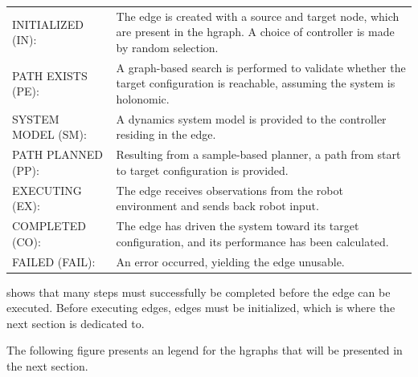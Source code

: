 \noindent
\begin{table}[H]
\centering
\begin{tabular}%
  {>{\raggedleft\arraybackslash}p{}%
   >{\raggedright\arraybackslash}p{}}
INITIALIZED (IN): & The edge is created with a source and target node, which are present in the \ac{hgraph}. A choice of controller is made by random selection. \\
PATH EXISTS (PE): & A graph-based search is performed to validate whether the target configuration is reachable, assuming the system is holonomic. \\
SYSTEM MODEL (SM): & A dynamics system model is provided to the controller residing in the edge. \\
PATH PLANNED (PP): & Resulting from a sample-based planner, a path from start to target configuration is provided. \\
EXECUTING (EX): & The edge receives observations from the robot environment and sends back robot input. \\
COMPLETED (CO): & The edge has driven the system toward its target configuration, and its performance has been calculated. \\
FAILED (FAIL): & An error occurred, yielding the edge unusable. \\
\end{tabular}
\end{table}

 shows that many steps must successfully be completed before the edge can be executed.
Before executing edges, edges must be initialized, which is where the next section is dedicated to.\bs

The following figure presents an legend for the \ac{hgraph}s that will be presented in the next section.\bs

